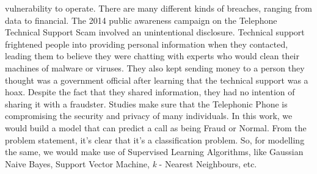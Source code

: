 \documentclass[sn-mathphys]{sn-jnl}%
\theoremstyle{thmstyleone}%
\theoremstyle{thmstyletwo}%
\theoremstyle{thmstylethree}%
\begin{document}
vulnerability to operate. There are many different kinds of breaches, ranging from data to financial. The 2014 public awareness campaign on the Telephone Technical Support Scam involved an unintentional disclosure. Technical support frightened people into providing personal information when they contacted, leading them to believe they were chatting with experts who would clean their machines of malware or viruses. They also kept sending money to a person they thought was a government official after learning that the technical support was a hoax. Despite the fact that they shared information, they had no intention of sharing it with a fraudster. Studies make sure that the Telephonic Phone is compromising the security and privacy of many individuals. In this work, we would build a model that can predict a call as being Fraud or Normal. From the problem statement, it's clear that it's a classification problem. So, for modelling the same, we would make use of Supervised Learning Algorithms, like Gaussian Naive Bayes, Support Vector Machine, \textit{k} - Nearest Neighbours, etc.
\end{document}
